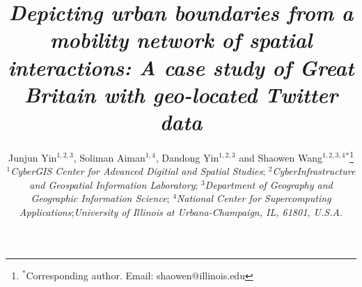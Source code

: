 \documentclass[]{tGIS2e}
\begin{document}


\title{{\itshape Depicting urban boundaries from a mobility network of spatial interactions: A case study of Great Britain with geo-located Twitter data}}

\author{Junjun Yin$^{1,2,3}$, Soliman Aiman$^{1,4}$, Dandong Yin$^{1,2,3}$ and Shaowen Wang$^{1,2,3,4}$$^{\ast}$\thanks{$^\ast$Corresponding author. Email: shaowen@illinois.edu
\vspace{6pt}}\\\vspace{6pt}  $^{1}${\em{CyberGIS Center for Advanced Digitial and Spatial Studies}};
$^{2}${\em{CyberInfrastructure and Geospatial Information Laboratory}};
$^{3}${\em{Department of Geography and Geographic Information Science}};
$^{4}${\em{National Center for Supercomputing Applications}};{\em{University of Illinois at Urbana-Champaign, IL, 61801, U.S.A.}}
\\\vspace{6pt}}
\maketitle
\end{document}
